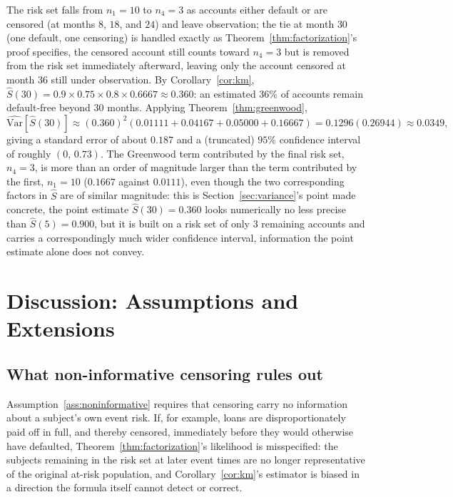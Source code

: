 \documentclass[11pt]{article}
\theoremstyle{remark}
\theoremstyle{definition}
\begin{document}
The risk set falls from $n_1=10$ to $n_4=3$ as accounts either default or are censored (at months $8$, $18$, and $24$) and leave observation; the tie at month $30$ (one default, one censoring) is handled exactly as Theorem~\ref{thm:factorization}'s proof specifies, the censored account still counts toward $n_4=3$ but is removed from the risk set immediately afterward, leaving only the account censored at month $36$ still under observation. By Corollary~\ref{cor:km}, $\hat S(30)=0.9\times0.75\times0.8\times0.6667\approx0.360$: an estimated $36\%$ of accounts remain default-free beyond 30 months. Applying Theorem~\ref{thm:greenwood},
\begin{equation*}
\widehat{\mathrm{Var}}[\hat S(30)] \approx (0.360)^2(0.01111+0.04167+0.05000+0.16667) = 0.1296(0.26944) \approx 0.0349,
\end{equation*}
giving a standard error of about $0.187$ and a (truncated) $95\%$ confidence interval of roughly $(0,\,0.73)$. The Greenwood term contributed by the final risk set, $n_4=3$, is more than an order of magnitude larger than the term contributed by the first, $n_1=10$ ($0.1667$ against $0.0111$), even though the two corresponding factors in $\hat S$ are of similar magnitude: this is Section~\ref{sec:variance}'s point made concrete, the point estimate $\hat S(30)=0.360$ looks numerically no less precise than $\hat S(5)=0.900$, but it is built on a risk set of only $3$ remaining accounts and carries a correspondingly much wider confidence interval, information the point estimate alone does not convey.

\section{Discussion: Assumptions and Extensions}
\label{sec:discussion}

\subsection{What non-informative censoring rules out}
Assumption~\ref{ass:noninformative} requires that censoring carry no information about a subject's own event risk. If, for example, loans are disproportionately paid off in full, and thereby censored, immediately before they would otherwise have defaulted, Theorem~\ref{thm:factorization}'s likelihood is misspecified: the subjects remaining in the risk set at later event times are no longer representative of the original at-risk population, and Corollary~\ref{cor:km}'s estimator is biased in a direction the formula itself cannot detect or correct.
\end{document}
